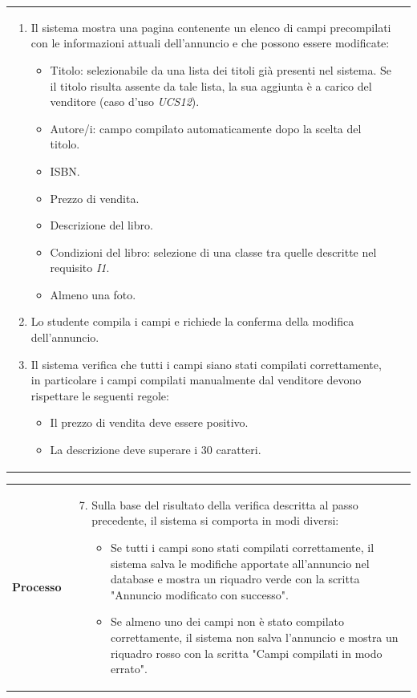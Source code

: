 \documentclass[10pt,a4paper]{report}
\begin{document}
\begin{tabular}{lp{}}
\begin{enumerate}
			
			\item Il sistema mostra una pagina contenente un elenco di campi precompilati con le informazioni attuali dell'annuncio e che possono essere modificate:
			\begin{itemize}
				\item Titolo: selezionabile da una lista dei titoli già presenti nel sistema. Se il titolo risulta assente da tale lista, la sua aggiunta è a carico del venditore (caso d'uso \textit{UCS12}).
				\item Autore/i: campo compilato automaticamente dopo la scelta del titolo.
				\item ISBN.
				\item Prezzo di vendita.
				\item Descrizione del libro.
				\item Condizioni del libro: selezione di una classe tra quelle descritte nel requisito \textit{I1}.
				\item Almeno una foto.
			\end{itemize}
			\item Lo studente compila i campi e richiede la conferma della modifica dell'annuncio.
			\item Il sistema verifica che tutti i campi siano stati compilati correttamente, in particolare i campi compilati manualmente dal venditore devono rispettare le seguenti regole:
			\begin{itemize}
				\item Il prezzo di vendita deve essere positivo.
				\item La descrizione deve superare i 30 caratteri.
			\end{itemize}
		\end{enumerate}
	\end{tabular}
	
	\begin{tabular}{lp{}}
		\textbf{Processo}&\begin{enumerate}
			\setcounter{enumi}{6}
			\item Sulla base del risultato della verifica descritta al passo precedente, il sistema si comporta in modi diversi:
			\begin{itemize}
				\item Se tutti i campi sono stati compilati correttamente, il sistema salva le modifiche apportate all'annuncio nel database e mostra un riquadro verde con la scritta "Annuncio modificato con successo".
				\item Se almeno uno dei campi non è stato compilato correttamente, il sistema non salva l'annuncio e mostra un riquadro rosso con la scritta "Campi compilati in modo errato".
			\end{itemize}
		\end{enumerate}
	\end{tabular}
	
\end{document}

